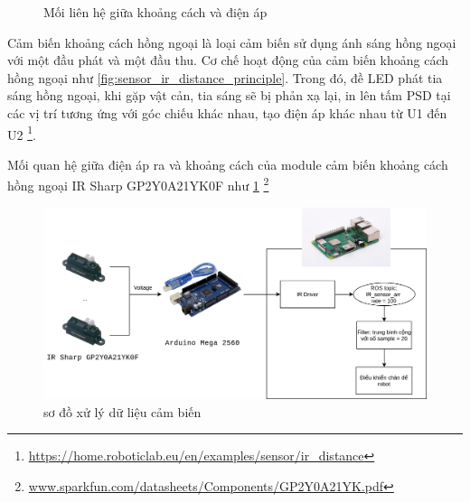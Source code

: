 \begin{figure}[htbp]
    \centering
    \caption{Mối liên hệ giữa khoảng cách và điện áp}
    \label{fig:irSharp-vol-distance}
\end{figure}

Cảm biến khoảng cách hồng ngoại là loại cảm biến sử dụng ánh sáng hồng ngoại với một đầu phát và một đầu thu. Cơ chế hoạt động của cảm biến khoảng cách hồng ngoại như \figurename{ \ref{fig:sensor_ir_distance_principle}}. Trong đó, đề LED phát tia sáng hồng ngoại, khi gặp vật cản, tia sáng sẽ bị phản xạ lại, in lên tấm PSD tại các vị trí tương ứng với góc chiếu khác nhau, tạo điện áp khác nhau từ U1 đến U2 \footnote{\url{https://home.roboticlab.eu/en/examples/sensor/ir_distance}}.

Mối quan hệ giữa điện áp ra và khoảng cách của module cảm biến khoảng cách hồng ngoại IR Sharp GP2Y0A21YK0F như \figurename{ \ref{fig:irSharp-vol-distance}} \footnote{\url{www.sparkfun.com/datasheets/Components/GP2Y0A21YK.pdf}}

\begin{figure}[htbp]
    \centering
    \includegraphics[width=\linewidth]{figures/ir_safety_controller-dataProcessing.png}
    \caption{sơ đồ xử lý dữ liệu cảm biến}
    \label{fig:workflow-dataProcessing}
\end{figure}

